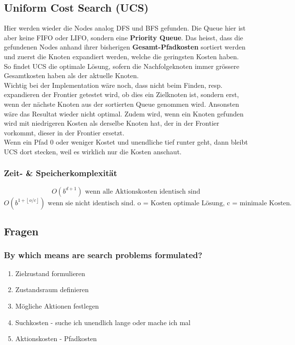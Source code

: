 \subsection{Uniform Cost Search (UCS)}
Hier werden wieder die Nodes analog DFS und BFS gefunden. Die Queue hier ist aber keine FIFO oder LIFO, sondern eine \textbf{Priority Queue}. Das heisst, dass die gefundenen Nodes anhand ihrer bisherigen \textbf{Gesamt-Pfadkosten} sortiert werden und zuerst die Knoten expandiert werden, welche die geringsten Kosten haben. So findet UCS die optimale Lösung, sofern die Nachfolgeknoten immer grössere Gesamtkosten haben als der aktuelle Knoten.\\ \newline
Wichtig bei der Implementation wäre noch, dass nicht beim Finden, resp. expandieren der Frontier getestet wird, ob dies ein Zielknoten ist, sondern erst, wenn der nächste Knoten aus der sortierten Queue genommen wird. Ansonsten wäre das Resultat wieder nicht optimal. Zudem wird, wenn ein Knoten gefunden wird mit niedrigeren Kosten als derselbe Knoten hat, der in der Frontier vorkommt, dieser in der Frontier ersetzt.\\ \newline
Wenn ein Pfad 0 oder weniger Kostet und unendliche tief runter geht, dann bleibt UCS dort stecken, weil es wirklich nur die Kosten anschaut.

\subsubsection{Zeit- \& Speicherkomplexität}
\begin{displaymath}
O(b^{d+1})  \textrm{ wenn alle Aktionskosten identisch sind}
\end{displaymath}
\begin{displaymath}
O(b^{1+\left\lfloor{o/c}\right \rfloor })  \textrm{ wenn sie nicht identisch sind. o = Kosten optimale Lösung, c = minimale Kosten einer Aktion}.
\end{displaymath}


\subsection{Fragen}
\subsubsection{By which means are search problems formulated?}
\begin{enumerate}
	\item Zielzustand formulieren
	\item Zustandsraum definieren
	\item Mögliche Aktionen festlegen
	\item Suchkosten - suche ich unendlich lange oder mache ich mal
	\item Aktionskosten - Pfadkosten
\end{enumerate}
